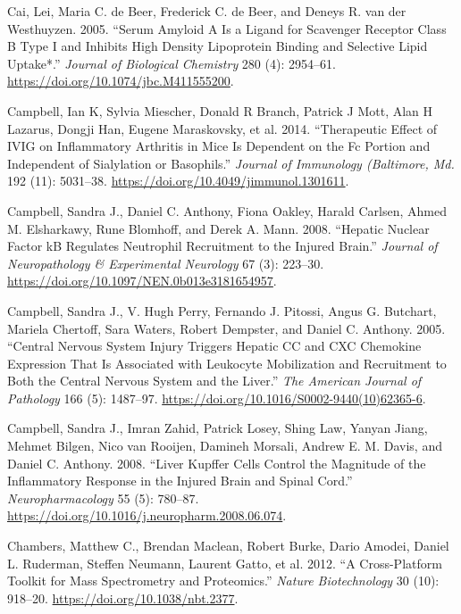 \documentclass[9pt,lineno]{elife}
\newlength{\cslhangindent}
\newlength{\cslentryspacingunit} %
\newenvironment{CSLReferences}[2] %
 {%
  \setlength{\parindent}{0pt}
  \ifodd #1
  \let\oldpar\par
  \def\par{\hangindent=\cslhangindent\oldpar}
  \fi
  \setlength{\parskip}{#2\cslentryspacingunit}
 }%
 {}
\begin{document}
\begin{landscape}
\begin{landscape}
\begin{landscape}
\begin{landscape}
\begin{CSLReferences}{1}{0}
\leavevmode{}%
Cai, Lei, Maria C. de Beer, Frederick C. de Beer, and Deneys R. van der Westhuyzen. 2005. {``Serum {Amyloid A Is} a {Ligand} for {Scavenger Receptor Class B Type I} and {Inhibits High Density Lipoprotein Binding} and {Selective Lipid Uptake}*.''} \emph{Journal of Biological Chemistry} 280 (4): 2954--61. \url{https://doi.org/10.1074/jbc.M411555200}.

\leavevmode{}%
Campbell, Ian K, Sylvia Miescher, Donald R Branch, Patrick J Mott, Alan H Lazarus, Dongji Han, Eugene Maraskovsky, et al. 2014. {``Therapeutic Effect of {IVIG} on Inflammatory Arthritis in Mice Is Dependent on the {Fc} Portion and Independent of Sialylation or Basophils.''} \emph{Journal of Immunology (Baltimore, Md.} 192 (11): 5031--38. \url{https://doi.org/10.4049/jimmunol.1301611}.

\leavevmode{}%
Campbell, Sandra J., Daniel C. Anthony, Fiona Oakley, Harald Carlsen, Ahmed M. Elsharkawy, Rune Blomhoff, and Derek A. Mann. 2008. {``Hepatic {Nuclear Factor kB Regulates Neutrophil Recruitment} to the {Injured Brain}.''} \emph{Journal of Neuropathology \& Experimental Neurology} 67 (3): 223--30. \url{https://doi.org/10.1097/NEN.0b013e3181654957}.

\leavevmode{}%
Campbell, Sandra J., V. Hugh Perry, Fernando J. Pitossi, Angus G. Butchart, Mariela Chertoff, Sara Waters, Robert Dempster, and Daniel C. Anthony. 2005. {``Central {Nervous System Injury Triggers Hepatic CC} and {CXC Chemokine Expression} That {Is Associated} with {Leukocyte Mobilization} and {Recruitment} to {Both} the {Central Nervous System} and the {Liver}.''} \emph{The American Journal of Pathology} 166 (5): 1487--97. \url{https://doi.org/10.1016/S0002-9440(10)62365-6}.

\leavevmode{}%
Campbell, Sandra J., Imran Zahid, Patrick Losey, Shing Law, Yanyan Jiang, Mehmet Bilgen, Nico van Rooijen, Damineh Morsali, Andrew E. M. Davis, and Daniel C. Anthony. 2008. {``Liver {Kupffer} Cells Control the Magnitude of the Inflammatory Response in the Injured Brain and Spinal Cord.''} \emph{Neuropharmacology} 55 (5): 780--87. \url{https://doi.org/10.1016/j.neuropharm.2008.06.074}.

\leavevmode{}%
Chambers, Matthew C., Brendan Maclean, Robert Burke, Dario Amodei, Daniel L. Ruderman, Steffen Neumann, Laurent Gatto, et al. 2012. {``A Cross-Platform Toolkit for Mass Spectrometry and Proteomics.''} \emph{Nature Biotechnology} 30 (10): 918--20. \url{https://doi.org/10.1038/nbt.2377}.


\end{CSLReferences}
\end{landscape}
\end{landscape}
\end{landscape}
\end{landscape}
\end{document}
